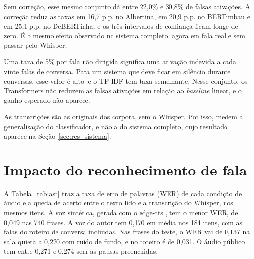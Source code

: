 \documentclass[
    12pt,                %
    openright,           %
    oneside,             %
    a4paper,             %
    english,             %
    brazil               %
]{abntex2}
\begin{document}
Sem correção, esse mesmo conjunto dá entre 22,0\% e 30,8\% de falsas ativações. A correção reduz as taxas em 16,7 p.p. no Albertina, em 20,9 p.p. no BERTimbau e em 25,1 p.p. no DeBERTinha, e os três intervalos de confiança ficam longe de zero. É o mesmo efeito observado no sistema completo, agora em fala real e sem passar pelo Whisper.

Uma taxa de 5\% por fala não dirigida significa uma ativação indevida a cada vinte falas de conversa. Para um sistema que deve ficar em silêncio durante conversas, esse valor é alto, e o TF-IDF tem taxa semelhante. Nesse conjunto, os Transformers não reduzem as falsas ativações em relação ao \textit{baseline} linear, e o ganho esperado não aparece.

As transcrições são as originais dos corpora, sem o Whisper. Por isso, medem a generalização do classificador, e não a do sistema completo, cujo resultado aparece na Seção~\ref{sec:res_sistema}.


\section{Impacto do reconhecimento de fala}
\label{sec:res_asr}

A Tabela~\ref{tab:asr} traz a taxa de erro de palavras (WER) de cada condição de áudio e a queda de acerto entre o texto lido e a transcrição do Whisper, nos mesmos itens. A voz sintética, gerada com o edge-tts \cite{EdgeTTS}, tem o menor WER, de 0,049 nas 740 frases. A voz do autor tem 0,170 em média nos 184 itens, com as falas do roteiro de conversa incluídas. Nas frases do teste, o WER vai de 0,137 na sala quieta a 0,220 com ruído de fundo, e no roteiro é de 0,031. O áudio público tem entre 0,271 e 0,274 sem as pausas preenchidas.
\end{document}
